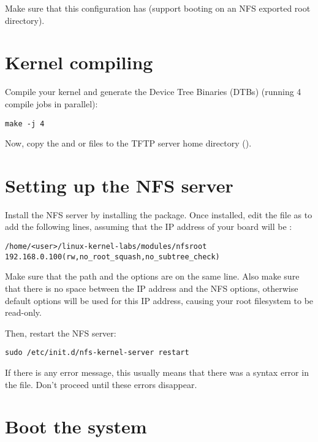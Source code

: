 Make sure that this configuration has  (support
booting on an NFS exported root directory).

\section{Kernel compiling}

Compile your kernel and generate the Device Tree Binaries (DTBs)
(running 4 compile jobs in parallel):

\begin{verbatim}
make -j 4 
\end{verbatim}

Now, copy the  and 
or  files
to the TFTP server home directory ().

\section{Setting up the NFS server}

Install the NFS server by installing the 
package. Once installed, edit the  file as
 to add the following lines, assuming that the IP address
of your board will be :

\scriptsize
\begin{verbatim}
/home/<user>/linux-kernel-labs/modules/nfsroot 192.168.0.100(rw,no_root_squash,no_subtree_check)
\end{verbatim}
\normalsize

Make sure that the path and the options are on the same line.
Also make sure that there is no space between the IP address and the NFS
options, otherwise default options will be used for this IP address,
causing your root filesystem to be read-only.

Then, restart the NFS server:

\begin{verbatim}
sudo /etc/init.d/nfs-kernel-server restart
\end{verbatim}

If there is any error message, this usually means that there was a
syntax error in the  file. Don't proceed until these
errors disappear.

\section{Boot the system}

